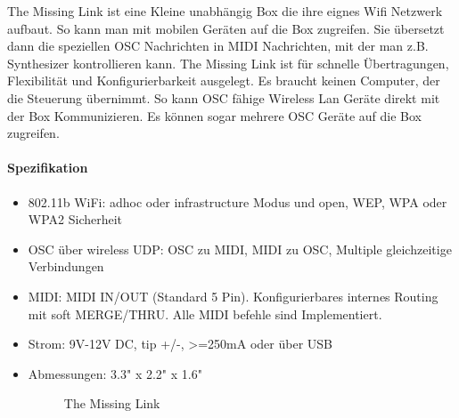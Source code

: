 \documentclass[a4paper, 12pt]{article}
\begin{document}
The Missing Link ist eine Kleine unabhängig Box die ihre eignes Wifi Netzwerk aufbaut. So kann man mit mobilen Geräten auf die Box zugreifen. Sie übersetzt dann die speziellen OSC Nachrichten in MIDI Nachrichten, mit der man z.B. Synthesizer kontrollieren kann. The Missing Link ist für schnelle Übertragungen, Flexibilität und Konfigurierbarkeit ausgelegt. Es braucht keinen Computer, der die Steuerung übernimmt. So kann OSC fähige Wireless Lan Geräte direkt mit der Box Kommunizieren. Es können sogar mehrere OSC Geräte auf die Box zugreifen.
\paragraph{Spezifikation}
\begin{itemize}
  \item 802.11b WiFi: adhoc oder infrastructure Modus und open, WEP, WPA oder WPA2 Sicherheit
  \item OSC über wireless UDP: OSC zu MIDI, MIDI zu OSC, Multiple gleichzeitige Verbindungen
  \item MIDI: MIDI IN/OUT (Standard 5 Pin). Konfigurierbares internes Routing mit soft MERGE/THRU. Alle MIDI befehle sind Implementiert.
  \item Strom: 9V-12V DC, tip +/-, >=250mA oder über USB
  \item Abmessungen: 3.3" x 2.2" x 1.6"
\begin{figure}[!htb]
  \centering
  \caption[The Missing link \cite{TMLI}]{The Missing Link} 
  \label{fig:TMLI}
\end{figure}
\end{itemize}
\end{document}
